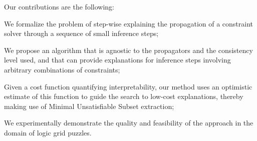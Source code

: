 
\noindent Our contributions are the following:
\begin{compactitem}
	\item We formalize the problem of step-wise explaining the propagation of a constraint solver through a sequence of small inference steps;
	\item We propose an algorithm that is agnostic to the propagators and the consistency level used, and that can provide explanations for inference steps involving arbitrary combinations of constraints;
	\item Given a cost function quantifying interpretability, our method uses an optimistic estimate of this function to guide the search to low-cost explanations, thereby making use of Minimal Unsatisfiable Subset extraction;
	\item We experimentally demonstrate the quality and feasibility of the approach in the domain of logic grid puzzles.
\end{compactitem}




